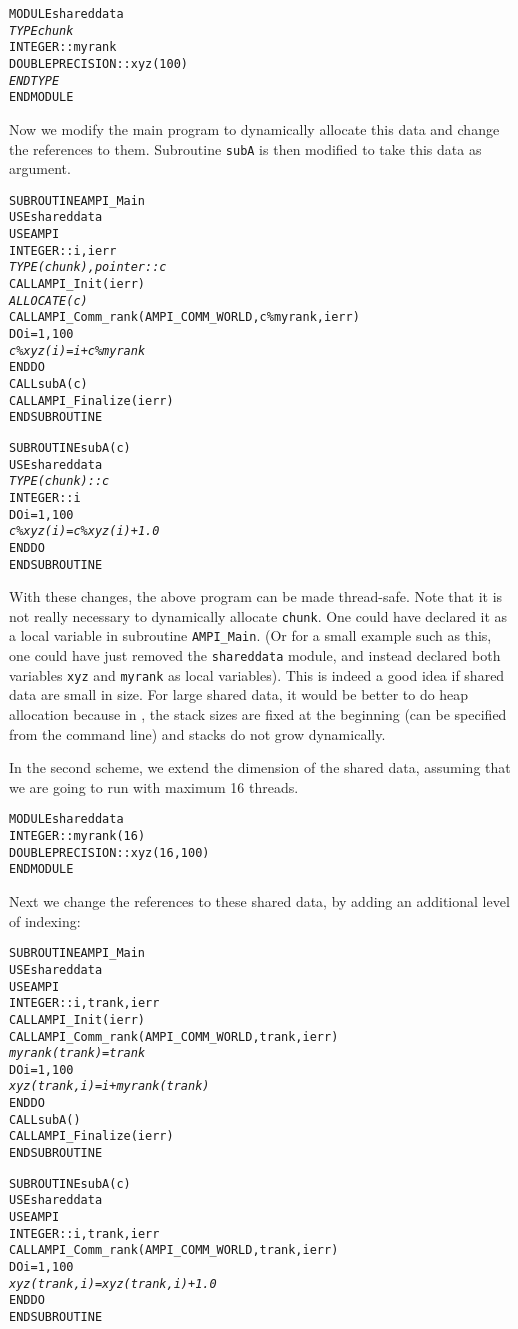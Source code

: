 \documentclass[10pt]{article}
\begin{document}
\begin{alltt}
MODULE shareddata
  \emph{TYPE chunk}
    INTEGER :: myrank
    DOUBLE PRECISION :: xyz(100)
  \emph{END TYPE}
END MODULE
\end{alltt}

Now we modify the main program to dynamically allocate this data and change the
references to them. Subroutine \texttt{subA} is then modified to take this data
as argument.

\begin{alltt}
SUBROUTINE AMPI_Main
  USE shareddata
  USE AMPI
  INTEGER :: i, ierr
  \emph{TYPE(chunk), pointer :: c}
  CALL AMPI_Init(ierr)
  \emph{ALLOCATE(c)}
  CALL AMPI_Comm_rank(AMPI_COMM_WORLD, c\%myrank, ierr)
  DO i = 1, 100
    \emph{c\%xyz(i) =  i + c\%myrank}
  END DO
  CALL subA(c)
  CALL AMPI_Finalize(ierr)
END SUBROUTINE

SUBROUTINE subA(c)
  USE shareddata
  \emph{TYPE(chunk) :: c}
  INTEGER :: i
  DO i = 1, 100
    \emph{c\%xyz(i) = c\%xyz(i) + 1.0}
  END DO
END SUBROUTINE
\end{alltt}

With these changes, the above program can be made thread-safe. Note that it is
not really necessary to dynamically allocate \texttt{chunk}. One could have
declared it as a local variable in subroutine \texttt{AMPI\_Main}.  (Or for a
small example such as this, one could have just removed the \texttt{shareddata}
module, and instead declared both variables \texttt{xyz} and \texttt{myrank} as
local variables). This is indeed a good idea if shared data are small in size.
For large shared data, it would be better to do heap allocation because in
\ampi{}, the stack sizes are fixed at the beginning (can be specified from the
command line) and stacks do not grow dynamically.

In the second scheme, we extend the dimension of the shared data, assuming that
we are going to run with maximum 16 threads.

\begin{alltt}
MODULE shareddata
  INTEGER :: myrank(16)
  DOUBLE PRECISION :: xyz(16, 100)
END MODULE
\end{alltt}

Next we change the references to these shared data, by adding an additional
level of indexing:

\begin{alltt}
SUBROUTINE AMPI_Main
  USE shareddata
  USE AMPI
  INTEGER :: i, trank, ierr
  CALL AMPI_Init(ierr)
  CALL AMPI_Comm_rank(AMPI_COMM_WORLD, trank, ierr)
  \emph{myrank(trank) = trank}
  DO i = 1, 100
    \emph{xyz(trank, i) =  i + myrank(trank)}
  END DO
  CALL subA()
  CALL AMPI_Finalize(ierr)
END SUBROUTINE

SUBROUTINE subA(c)
  USE shareddata
  USE AMPI
  INTEGER :: i, trank, ierr
  CALL AMPI_Comm_rank(AMPI_COMM_WORLD, trank, ierr)
  DO i = 1, 100
    \emph{xyz(trank, i) = xyz(trank, i) + 1.0}
  END DO
END SUBROUTINE
\end{alltt}
\end{document}
